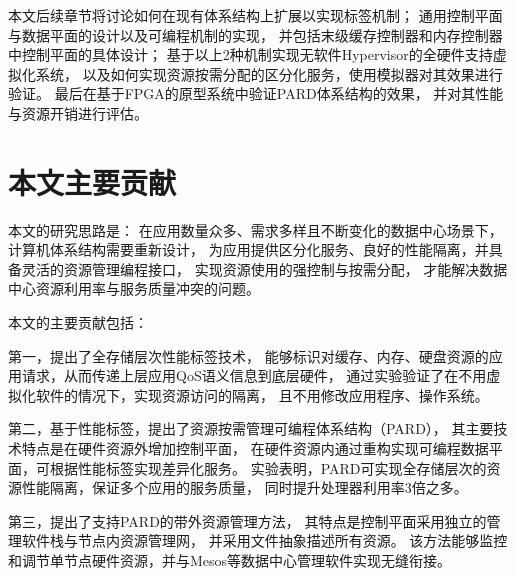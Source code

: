 本文后续章节将讨论如何在现有体系结构上扩展以实现标签机制；
通用控制平面与数据平面的设计以及可编程机制的实现，
并包括末级缓存控制器和内存控制器中控制平面的具体设计；
基于以上2种机制实现无软件Hypervisor的全硬件支持虚拟化系统，
以及如何实现资源按需分配的区分化服务，使用模拟器对其效果进行验证。
最后在基于FPGA的原型系统中验证PARD体系结构的效果，
并对其性能与资源开销进行评估。


\section{本文主要贡献}

本文的研究思路是：
在应用数量众多、需求多样且不断变化的数据中心场景下，计算机体系结构需要重新设计，
为应用提供区分化服务、良好的性能隔离，并具备灵活的资源管理编程接口，
实现资源使用的强控制与按需分配，
才能解决数据中心资源利用率与服务质量冲突的问题。

本文的主要贡献包括：

第一，提出了全存储层次性能标签技术，
能够标识对缓存、内存、硬盘资源的应用请求，从而传递上层应用QoS语义信息到底层硬件，
通过实验验证了在不用虚拟化软件的情况下，实现资源访问的隔离，
且不用修改应用程序、操作系统。

第二，基于性能标签，提出了资源按需管理可编程体系结构（PARD），
其主要技术特点是在硬件资源外增加控制平面，
在硬件资源内通过重构实现可编程数据平面，可根据性能标签实现差异化服务。
实验表明，PARD可实现全存储层次的资源性能隔离，保证多个应用的服务质量，
同时提升处理器利用率3倍之多。

第三，提出了支持PARD的带外资源管理方法，
其特点是控制平面采用独立的管理软件栈与节点内资源管理网，
并采用文件抽象描述所有资源。
该方法能够监控和调节单节点硬件资源，并与Mesos等数据中心管理软件实现无缝衔接。


